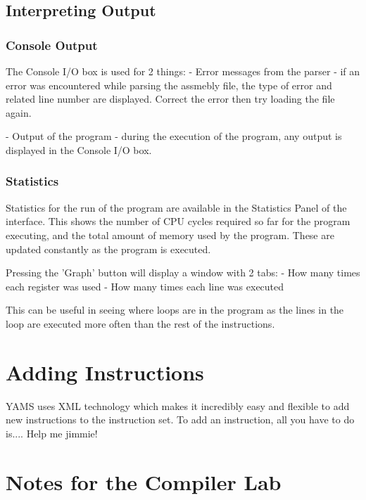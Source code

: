 \documentclass[12pt]{report}
\begin{document}
\subsection{Interpreting Output}


\subsubsection{Console Output}
The Console I/O box is used for 2 things:
- Error messages from the parser - if an error was encountered while parsing the assmebly file, the type of error and related line number are displayed.  Correct the error then try loading the file again.

- Output of the program - during the execution of the program, any output is displayed in the Console I/O box.

\subsubsection{Statistics}
Statistics for the run of the program are available in the Statistics Panel of the interface.  This shows the number of CPU cycles required so far for the program executing, and the total amount of memory used by the program.  These are updated constantly as the program is executed.


Pressing the 'Graph' button will display a window with 2 tabs:
- How many times each register was used
- How many times each line was executed

This can be useful in seeing where loops are in the program as the lines in the loop are executed more often than the rest of the instructions.

\section{Adding Instructions}

YAMS uses XML technology which makes it incredibly easy and flexible to add new instructions to the instruction set.  To add an instruction, all you have to do is....
Help me jimmie!


\section{Notes for the Compiler Lab}
\end{document}
